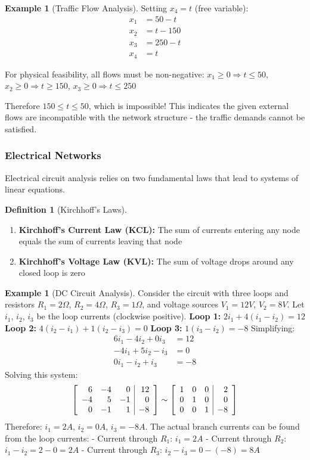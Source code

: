 \documentclass[12pt]{article}
\numberwithin{equation}{section}
\newenvironment{amatrix}[1]{%
  \left[\begin{array}{#1}}
  {\end{array}\right]}
\theoremstyle{plain}
\theoremstyle{definition}
\newtheorem{definition}[theorem]{Definition}
\newtheorem{example}[theorem]{Example}
\theoremstyle{remark}
\begin{document}
\begin{example}[Traffic Flow Analysis]
Setting $x_4 = t$ (free variable):
\begin{align}
x_1 &= 50 - t\\
x_2 &= t - 150\\  
x_3 &= 250 - t\\
x_4 &= t
\end{align}

For physical feasibility, all flows must be non-negative:
$x_1 \geq 0 \Rightarrow t \leq 50$, $x_2 \geq 0 \Rightarrow t \geq 150$, $x_3 \geq 0 \Rightarrow t \leq 250$

Therefore $150 \leq t \leq 50$, which is impossible! This indicates the given external flows are incompatible with the network structure - the traffic demands cannot be satisfied.
\end{example}

\subsubsection{Electrical Networks}
Electrical circuit analysis relies on two fundamental laws that lead to systems of linear equations.
\begin{definition}[Kirchhoff's Laws]
\begin{enumerate}
\item \textbf{Kirchhoff's Current Law (KCL):} The sum of currents entering any node equals the sum of currents leaving that node
\item \textbf{Kirchhoff's Voltage Law (KVL):} The sum of voltage drops around any closed loop is zero
\end{enumerate}
\end{definition}
\begin{example}[DC Circuit Analysis]
Consider the circuit with three loops and resistors $R_1 = 2\Omega$, $R_2 = 4\Omega$, $R_3 = 1\Omega$, and voltage sources $V_1 = 12V$, $V_2 = 8V$.
Let $i_1$, $i_2$, $i_3$ be the loop currents (clockwise positive).
\textbf{Loop 1:} $2i_1 + 4(i_1 - i_2) = 12$
\textbf{Loop 2:} $4(i_2 - i_1) + 1(i_2 - i_3) = 0$  
\textbf{Loop 3:} $1(i_3 - i_2) = -8$
Simplifying:
\begin{align}
6i_1 - 4i_2 + 0i_3 &= 12\\
-4i_1 + 5i_2 - i_3 &= 0\\
0i_1 - i_2 + i_3 &= -8
\end{align}
Solving this system:
$$\begin{amatrix}{rrr|r}
6 & -4 & 0 & 12\\
-4 & 5 & -1 & 0\\
0 & -1 & 1 & -8
\end{amatrix} \sim \begin{amatrix}{rrr|r}
1 & 0 & 0 & 2\\
0 & 1 & 0 & 0\\
0 & 0 & 1 & -8
\end{amatrix}$$
Therefore: $i_1 = 2A$, $i_2 = 0A$, $i_3 = -8A$.
The actual branch currents can be found from the loop currents:
- Current through $R_1$: $i_1 = 2A$
- Current through $R_2$: $i_1 - i_2 = 2 - 0 = 2A$
- Current through $R_3$: $i_2 - i_3 = 0 - (-8) = 8A$
\end{example}
\end{document}
